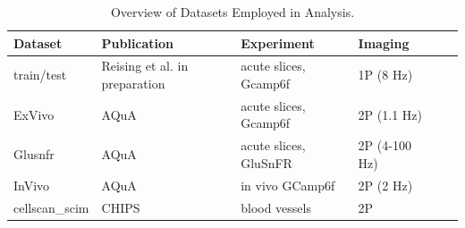\documentclass[utf8]{FrontiersinHarvard}
\begin{document}

    \bgroup
    \def\arraystretch{1.5}
    \begin{table}[htb]
        \centering
        \caption{Overview of Datasets Employed in Analysis. \newline}
        \label{tab:datasets}
        \begin{tabular}{|l|l|l|l|l|l|}
            \hline
            \textbf{Dataset} & \textbf{Publication}              & \textbf{Experiment}   & \textbf{Imaging}   \\ \hline
            train/test       & Reising et al. in preparation     & acute slices, Gcamp6f & \ac{1P} (8 Hz)     \\ \hline
            ExVivo           & AQuA\citep{wang_event-based_2018} & acute slices, Gcamp6f & \ac{2P} (1.1 Hz)   \\ \hline
            Glusnfr          & AQuA\citep{wang_event-based_2018} & acute slices, GluSnFR & \ac{2P} (4-100 Hz) \\ \hline
            InVivo           & AQuA\citep{wang_event-based_2018} & in vivo GCamp6f       & \ac{2P} (2 Hz)     \\ \hline
            cellscan\_scim   & CHIPS\citep{barrett_chips_2018}   & blood vessels         & \ac{2P}            \\ \hline
        \end{tabular}
    \end{table}
    \egroup

\end{document}
